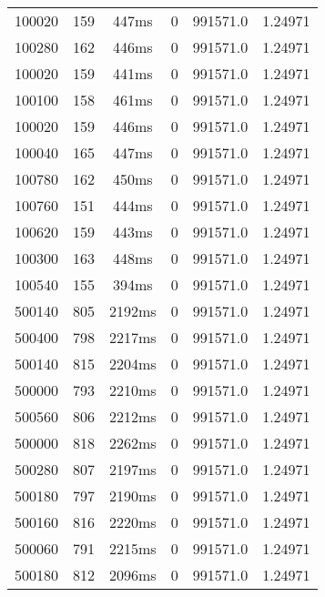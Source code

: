 \documentclass[./main.tex]{subfiles}
\begin{document}
\begin{table}
\begin{tabular}{ c | c | c | c | c | c }
        \hline
        \rowcolor{lightgray} 100020 & 159 & 447ms & 0 & 991571.0 & 1.24971 \\
        \rowcolor{lightgray} 100280 & 162 & 446ms & 0 & 991571.0 & 1.24971 \\
        \rowcolor{lightgray} 100020 & 159 & 441ms & 0 & 991571.0 & 1.24971 \\
        \rowcolor{lightgray} 100100 & 158 & 461ms & 0 & 991571.0 & 1.24971 \\
        \rowcolor{lightgray} 100020 & 159 & 446ms & 0 & 991571.0 & 1.24971 \\
        \rowcolor{lightgray} 100040 & 165 & 447ms & 0 & 991571.0 & 1.24971 \\
        \rowcolor{lightgray} 100780 & 162 & 450ms & 0 & 991571.0 & 1.24971 \\
        \rowcolor{lightgray} 100760 & 151 & 444ms & 0 & 991571.0 & 1.24971 \\
        \rowcolor{lightgray} 100620 & 159 & 443ms & 0 & 991571.0 & 1.24971 \\
        \rowcolor{lightgray} 100300 & 163 & 448ms & 0 & 991571.0 & 1.24971 \\
        \rowcolor{lightgray} 100540 & 155 & 394ms & 0 & 991571.0 & 1.24971 \\
        \hline
        \rowcolor{lightgray} 500140 & 805 & 2192ms & 0 & 991571.0 & 1.24971 \\
        \rowcolor{lightgray} 500400 & 798 & 2217ms & 0 & 991571.0 & 1.24971 \\
        \rowcolor{lightgray} 500140 & 815 & 2204ms & 0 & 991571.0 & 1.24971 \\
        \rowcolor{lightgray} 500000 & 793 & 2210ms & 0 & 991571.0 & 1.24971 \\
        \rowcolor{lightgray} 500560 & 806 & 2212ms & 0 & 991571.0 & 1.24971 \\
        \rowcolor{lightgray} 500000 & 818 & 2262ms & 0 & 991571.0 & 1.24971 \\
        \rowcolor{lightgray} 500280 & 807 & 2197ms & 0 & 991571.0 & 1.24971 \\
        \rowcolor{lightgray} 500180 & 797 & 2190ms & 0 & 991571.0 & 1.24971 \\
        \rowcolor{lightgray} 500160 & 816 & 2220ms & 0 & 991571.0 & 1.24971 \\
        \rowcolor{lightgray} 500060 & 791 & 2215ms & 0 & 991571.0 & 1.24971 \\
        \rowcolor{lightgray} 500180 & 812 & 2096ms & 0 & 991571.0 & 1.24971 \\

\end{tabular}
\end{table}
\end{document}
